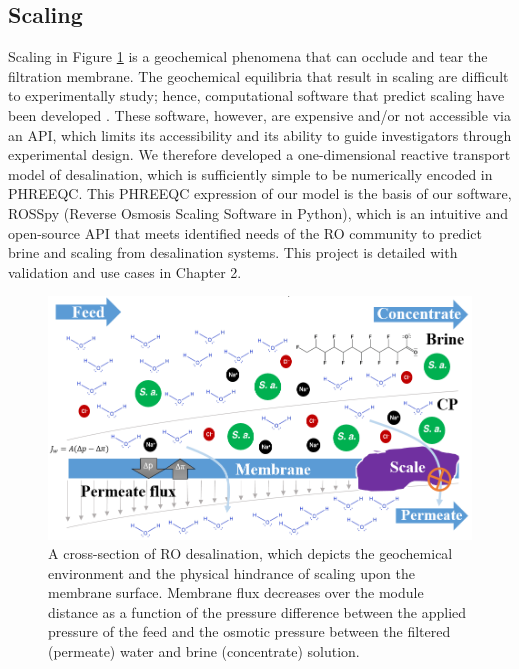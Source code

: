 \subsection{Scaling}
Scaling in Figure \ref{desalination_schema} is a geochemical phenomena that can occlude and tear the filtration membrane. The geochemical equilibria that result in scaling are difficult to experimentally study; hence, computational software that predict scaling have been developed \cite{Strubbe2018CalibrationFull-Scale}. These software, however, are expensive and/or not accessible via an API, which limits its accessibility and its ability to guide investigators through experimental design. We therefore developed a one-dimensional reactive transport model of desalination, which is sufficiently simple to be numerically encoded in PHREEQC. This PHREEQC expression of our model is the basis of our software, ROSSpy (Reverse Osmosis Scaling Software in Python), which is an intuitive and open-source API that meets identified needs of the RO community to predict brine and scaling from desalination systems. This project is detailed with validation and use cases in Chapter 2.

\begin{figure}
    \centering
    \includegraphics[width = \textwidth]{images/Introduction/desalination_schema_3.PNG}
    \caption{
        A cross-section of RO desalination, which depicts the geochemical environment and the physical hindrance of scaling upon the membrane surface.  Membrane flux decreases over the module distance as a function of the pressure difference between the applied pressure of the feed and the osmotic pressure between the filtered (permeate) water and brine (concentrate) solution.    
    }
    \label{desalination_schema}
\end{figure}

